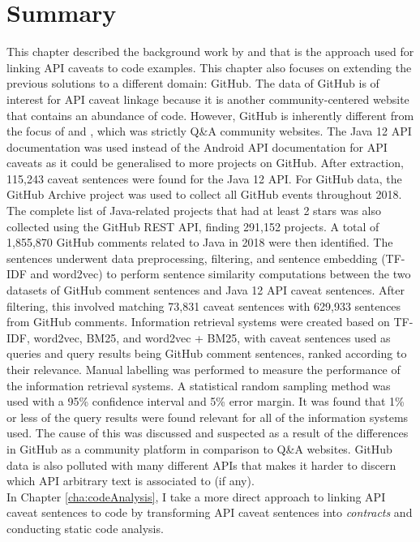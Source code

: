 \section{Summary}
\label{sec:info-summary}
This chapter described the background work by \cite{jiamou} and \cite{xiaoxue} that is the approach used for linking API caveats to code examples. This chapter also focuses on extending the previous solutions to a different domain: GitHub. The data of GitHub is of interest for API caveat linkage because it is another community-centered website that contains an abundance of code. However, GitHub is inherently different from the focus of \cite{jiamou} and \cite{xiaoxue}, which was strictly Q\&A community websites. The Java 12 API documentation was used instead of the Android API documentation for API caveats as it could be generalised to more projects on GitHub. After extraction, 115,243 caveat sentences were found for the Java 12 API. For GitHub data, the GitHub Archive project was used to collect all GitHub events throughout 2018. The complete list of Java-related projects that had at least 2 stars was also collected using the GitHub REST API, finding 291,152 projects. A total of 1,855,870 GitHub comments related to Java in 2018 were then identified. The sentences underwent data preprocessing, filtering, and sentence embedding (TF-IDF and word2vec) to perform sentence similarity computations between the two datasets of GitHub comment sentences and Java 12 API caveat sentences. After filtering, this involved matching 73,831 caveat sentences with 629,933 sentences from GitHub comments.
Information retrieval systems were created based on TF-IDF, word2vec, BM25, and word2vec + BM25, with caveat sentences used as queries and query results being GitHub comment sentences, ranked according to their relevance. Manual labelling was performed to measure the performance of the information retrieval systems. A statistical random sampling method was used with a 95\% confidence interval and 5\% error margin. It was found that 1\% or less of the query results were found relevant for all of the information systems used. The cause of this was discussed and suspected as a result of the differences in GitHub as a community platform in comparison to Q\&A websites. GitHub data is also polluted with many different APIs that makes it harder to discern which API arbitrary text is associated to (if any).\\
In Chapter \ref{cha:codeAnalysis}, I take a more direct approach to linking API caveat sentences to code by transforming API caveat sentences into \textit{contracts} and conducting static code analysis.
